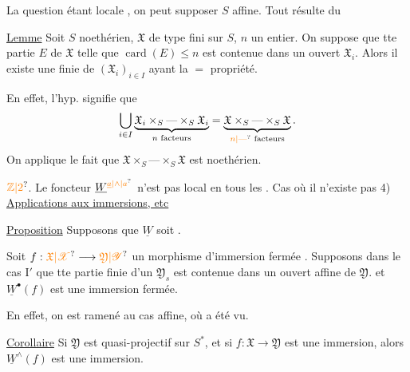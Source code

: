 La question étant locale , on peut supposer $S$ affine. Tout résulte du

\uline{Lemme} Soit $S$ noethérien, $\mathfrak X$ de type fini sur $S$, $n$ un entier.  On suppose que tte partie  $E$ de $\mathfrak X$ telle que $\operatorname{card}(E)\leq n$ est contenue dans un ouvert  $\mathfrak X_i$. Alors il existe une  finie de $(\mathfrak X_i)_{i\in I}$ ayant la $=$ propriété.

En effet, l'hyp. signifie que
\[
\bigcup_{i\in I}
\underbrace{\mathfrak X_i\times_S\text{---}\times_S\mathfrak X_i}_{n\text{ facteurs}}
=
\underbrace{\mathfrak X\times_S\text{---}\times_S\mathfrak X}_{\unsure{n|\text{---}}\text{ facteurs}}.
\]
On applique le fait que $\mathfrak X\times_S\text{---}\times_S\mathfrak X$ est  noethérien.

$\unsure{\mathbb Z|2}$. Le foncteur $\underline W^{\unsure{\underline a|\wedge|a}}$ n'est pas local en tous les . Cas où il n'existe pas 
4) \uline{Applications aux immersions, etc}

\uline{Proposition} Supposons que $\underline W$ soit  .

Soit $f:\unsure{\mathfrak X|\mathscr X}\longrightarrow\unsure{\mathfrak Y|\mathscr Y}$ un morphisme d'immersion  fermée . Supposons   dans le cas $\mathrm I'$ que  tte partie finie d'un $\mathfrak Y_s$ est contenue dans un ouvert affine de $\mathfrak Y$.  et $\underline W^{\bullet}(f)$  est une immersion fermée.

En effet, on est ramené au cas affine, où  a été vu.

\uline{Corollaire}  Si $\mathfrak Y$ est quasi-projectif sur $S^{*}$, et si $f:\mathfrak X\to\mathfrak Y$ est une immersion, alors $\underline W^\wedge(f)$ est une immersion.

